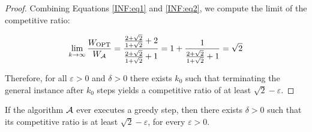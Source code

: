 \begin{proof}
Combining Equations \ref{INF:eq1} and \ref{INF:eq2}, we compute the limit of the
competitive ratio:

$$
\lim_{k \to \infty} \frac{W_{\text{OPT}}}{W_{\mathcal{A}}} =
\frac{\frac{2 + \sqrt{2}}{1 + \sqrt{2}} + 2}{\frac{2 + \sqrt{2}}{1 + \sqrt{2}} + 1}
= 1 + \frac{1}{\frac{2 + \sqrt{2}}{1 + \sqrt{2}} + 1} = \sqrt{2}
$$

Therefore, for all $\varepsilon > 0$ and $\delta > 0$ there exists $k_0$ such
that terminating the general instance after $k_0$ steps yields a competitive
ratio of at least $\sqrt{2} - \varepsilon$.
\end{proof}

\begin{lemma}\label{lem:general-finite}
If the algorithm $\mathcal{A}$ ever executes a greedy step, then there exists
$\delta > 0$ such that its competitive ratio is at least $\sqrt{2} -
\varepsilon$, for every $\varepsilon > 0$. \end{lemma}
